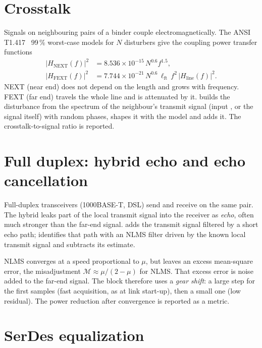 \section{Crosstalk}
Signals on neighbouring pairs of a binder couple electromagnetically. The ANSI T1.417~\cite{ansi417} 99\,\%
worst-case models for $N$ disturbers give the coupling power transfer functions
\begin{align}
  |H_{\mathrm{NEXT}}(f)|^2&=8.536\times10^{-15}\,N^{0.6}f^{1.5},\\
  |H_{\mathrm{FEXT}}(f)|^2&=7.744\times10^{-21}\,N^{0.6}\,\ell_{\mathrm{ft}}\,f^2\,|H_{\mathrm{line}}(f)|^2 .
\end{align}
NEXT (near end) does not depend on the length and grows with frequency. FEXT (far end) travels
the whole line and is attenuated by it.  builds the disturbance from the
spectrum of the neighbour's transmit signal (input , or the signal itself) with random
phases, shapes it with the model and adds it. The crosstalk-to-signal ratio is reported.

\section{Full duplex: hybrid echo and echo cancellation}
Full-duplex transceivers (1000BASE-T, DSL) send and receive on the same pair. The hybrid
leaks part of the local transmit signal into the receiver as \emph{echo}, often much stronger
than the far-end signal.  adds the transmit signal filtered by a short echo
path;  identifies that path with an NLMS filter driven by the known local
transmit signal and subtracts its estimate.

NLMS converges at a speed proportional to $\mu$, but leaves an excess mean-square error, the
misadjustment $\mathcal M\approx\mu/(2-\mu)$ for NLMS. That excess error is noise added to the
far-end signal. The block therefore uses a \emph{gear shift}: a large step for the first
 samples (fast acquisition, as at link start-up), then a small one (low
residual). The power reduction after convergence is reported as a metric.

\section{SerDes equalization}\label{sec:dfe}
